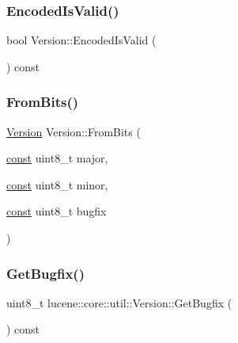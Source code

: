 \subsubsection{\texorpdfstring{Encoded\+Is\+Valid()}{EncodedIsValid()}}
{\footnotesize\ttfamily bool Version\+::\+Encoded\+Is\+Valid (\begin{DoxyParamCaption}{ }\end{DoxyParamCaption}) const\hspace{0.3cm}{\ttfamily [private]}}

\mbox{\label{classlucene_1_1core_1_1util_1_1Version_abe182afb477ee908c51a2bf3d484dbbd}} 
\subsubsection{\texorpdfstring{From\+Bits()}{FromBits()}}
{\footnotesize\ttfamily \mbox{\hyperlink{classlucene_1_1core_1_1util_1_1Version}{Version}} Version\+::\+From\+Bits (\begin{DoxyParamCaption}\item[{\mbox{\hyperlink{ZlibCrc32_8h_a2c212835823e3c54a8ab6d95c652660e}{const}} uint8\+\_\+t}]{major,  }\item[{\mbox{\hyperlink{ZlibCrc32_8h_a2c212835823e3c54a8ab6d95c652660e}{const}} uint8\+\_\+t}]{minor,  }\item[{\mbox{\hyperlink{ZlibCrc32_8h_a2c212835823e3c54a8ab6d95c652660e}{const}} uint8\+\_\+t}]{bugfix }\end{DoxyParamCaption})\hspace{0.3cm}{\ttfamily [static]}}

\mbox{\label{classlucene_1_1core_1_1util_1_1Version_aacda3d67f1307a84df168a3eae8d6725}} 
\subsubsection{\texorpdfstring{Get\+Bugfix()}{GetBugfix()}}
{\footnotesize\ttfamily uint8\+\_\+t lucene\+::core\+::util\+::\+Version\+::\+Get\+Bugfix (\begin{DoxyParamCaption}{ }\end{DoxyParamCaption}) const\hspace{0.3cm}{\ttfamily [inline]}}

